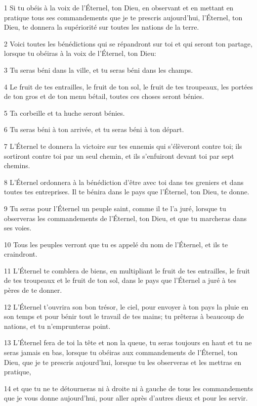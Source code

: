 \par 1 Si tu obéis à la voix de l'Éternel, ton Dieu, en observant et en mettant en pratique tous ses commandements que je te prescris aujourd'hui, l'Éternel, ton Dieu, te donnera la supériorité sur toutes les nations de la terre.
\par 2 Voici toutes les bénédictions qui se répandront sur toi et qui seront ton partage, lorsque tu obéiras à la voix de l'Éternel, ton Dieu:
\par 3 Tu seras béni dans la ville, et tu seras béni dans les champs.
\par 4 Le fruit de tes entrailles, le fruit de ton sol, le fruit de tes troupeaux, les portées de ton gros et de ton menu bétail, toutes ces choses seront bénies.
\par 5 Ta corbeille et ta huche seront bénies.
\par 6 Tu seras béni à ton arrivée, et tu seras béni à ton départ.
\par 7 L'Éternel te donnera la victoire sur tes ennemis qui s'élèveront contre toi; ils sortiront contre toi par un seul chemin, et ils s'enfuiront devant toi par sept chemins.
\par 8 L'Éternel ordonnera à la bénédiction d'être avec toi dans tes greniers et dans toutes tes entreprises. Il te bénira dans le pays que l'Éternel, ton Dieu, te donne.
\par 9 Tu seras pour l'Éternel un peuple saint, comme il te l'a juré, lorsque tu observeras les commandements de l'Éternel, ton Dieu, et que tu marcheras dans ses voies.
\par 10 Tous les peuples verront que tu es appelé du nom de l'Éternel, et ils te craindront.
\par 11 L'Éternel te comblera de biens, en multipliant le fruit de tes entrailles, le fruit de tes troupeaux et le fruit de ton sol, dans le pays que l'Éternel a juré à tes pères de te donner.
\par 12 L'Éternel t'ouvrira son bon trésor, le ciel, pour envoyer à ton pays la pluie en son temps et pour bénir tout le travail de tes mains; tu prêteras à beaucoup de nations, et tu n'emprunteras point.
\par 13 L'Éternel fera de toi la tête et non la queue, tu seras toujours en haut et tu ne seras jamais en bas, lorsque tu obéiras aux commandements de l'Éternel, ton Dieu, que je te prescris aujourd'hui, lorsque tu les observeras et les mettras en pratique,
\par 14 et que tu ne te détourneras ni à droite ni à gauche de tous les commandements que je vous donne aujourd'hui, pour aller après d'autres dieux et pour les servir.
